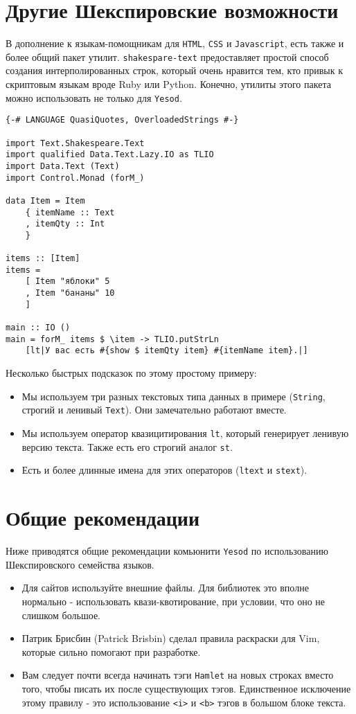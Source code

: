 \section{Другие Шекспировские возможности}

В дополнение к языкам-помощникам для \texttt{HTML}, \texttt{CSS} и \texttt{Javascript}, есть также и более
общий пакет утилит. \lstinline!shakespare-text! предоставляет простой способ 
создания интерполированных строк, который очень нравится тем, кто привык к 
скриптовым языкам вроде Ruby или Python. Конечно, утилиты этого пакета можно
использовать не только для \texttt{Yesod}.

\begin{lstlisting}
{-# LANGUAGE QuasiQuotes, OverloadedStrings #-}

import Text.Shakespeare.Text
import qualified Data.Text.Lazy.IO as TLIO
import Data.Text (Text)
import Control.Monad (forM_)

data Item = Item
    { itemName :: Text
    , itemQty :: Int
    }

items :: [Item]
items =
    [ Item "яблоки" 5
    , Item "бананы" 10
    ]

main :: IO ()
main = forM_ items $ \item -> TLIO.putStrLn
    [lt|У вас есть #{show $ itemQty item} #{itemName item}.|]
\end{lstlisting}

Несколько быстрых подсказок по этому простому примеру:
\begin{itemize}
\item Мы используем три разных текстовых типа данных в примере 
(\lstinline!String!, строгий и ленивый \lstinline!Text!). Они замечательно
работают вместе.
\item Мы используем оператор квазицитирования \lstinline!lt!, который генерирует
ленивую версию текста. Также есть его строгий аналог \lstinline!st!.
\item Есть и более длинные имена для этих операторов 
(\lstinline!ltext! и \lstinline!stext!).
\end{itemize}

\section{Общие рекомендации}

Ниже приводятся общие рекомендации комьюнити \texttt{Yesod} по использованию
Шекспировского семейства языков.

\begin{itemize}
\item Для сайтов используйте внешние файлы. Для библиотек это вполне 
нормально - использовать квази-квотирование, при условии, что оно не слишком большое.
\item Патрик Брисбин (Patrick Brisbin) сделал правила раскраски для Vim, 
которые сильно помогают при разработке.
\item Вам следует почти всегда начинать тэги \texttt{Hamlet} на новых строках вместо того,
чтобы писать их после существующих тэгов. Единственное исключение этому правилу - это
использование \lstinline!<i>! и \lstinline!<b>! тэгов в большом блоке текста.
\end{itemize}

